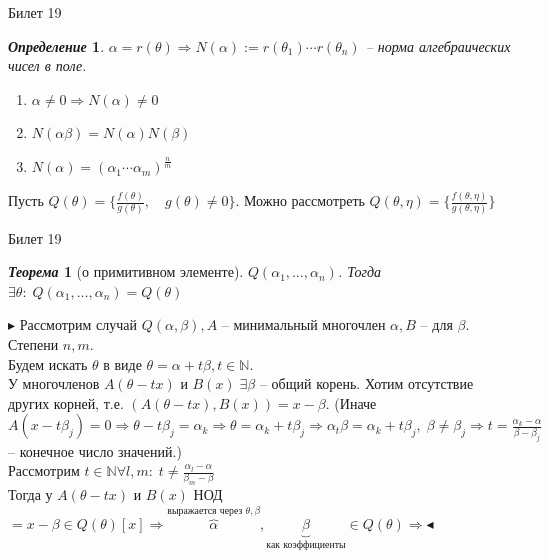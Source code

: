 \documentclass[a4paper,12pt]{article}
\newtheorem{deff}{\textit{Определение}}
\newtheorem{teo}{\textit{Теорема}}
\newcommand{\TE}{\theta}
\newcommand{\AL}{\alpha}
\newcommand{\q}{\quad}
\newcommand{\pb}{\blacktriangleright}
\newcommand{\pe}{\blacktriangleleft}
\newcommand{\Ra}{\Rightarrow}
\newcommand{\bb}[1]{\mathbb{#1}}
\begin{document}
\begin{mybox}{\hypertarget{bil19}{Билет 19}}
\begin{formbox}{}
\begin{deff} $\AL = r(\TE)\Ra N(\AL) := r(\TE_1)\cdots r(\TE_n)$ -- норма алгебраических чисел в поле.
\end{deff}
\end{formbox}

\begin{enumerate}
\item $\AL \not= 0 \Ra N(\AL) \not=0$
\item $N(\AL\beta) = N(\AL)N(\beta)$
\item $N(\AL) = (\AL_1\cdots\AL_m)^{\frac{n}{m}}$
\end{enumerate}
Пусть $Q(\TE) = \{\frac{f(\TE)}{g(\TE)}, \q g(\TE)\not=0\}$. Можно рассмотреть $Q(\TE, \eta) = \{\frac{f(\TE,\eta)}{g(\TE,\eta)}\}$\\
\end{mybox}

\newpage
\begin{mybox}{{Билет 19}}
\begin{formbox}{}
\begin{teo} [о примитивном элементе] $Q(\AL_1,\dots, \AL_n)$. Тогда $\exists \TE:\;Q(\AL_1,\dots, \AL_n) = Q(\TE)$
\end{teo}
\end{formbox}
$\pb$ Рассмотрим случай $Q(\AL, \beta), A$ -- минимальный многочлен $\AL, B$ -- для $\beta$. Степени $n, m$.\\
Будем искать $\TE$ в виде $\TE = \AL+t\beta, t\in\bb{N}$.\\
У многочленов $A(\TE - tx)$ и $B(x)\; \exists \beta$ -- общий корень. Хотим отсутствие других корней, т.е. $(A(\TE - tx), B(x)) = x - \beta$. (Иначе $A(x - t\beta_j) = 0\Ra \TE - t\beta_j = \AL_k \Ra \TE = \AL_k + t\beta_j\Ra \AL_t\beta = \AL_k + t\beta_j, \; \beta \not= \beta_j\Ra t = \frac{\AL_k - \AL}{\beta - \beta_j}$ -- конечное число значений.)\\
Рассмотрим $t\in\bb{N}\forall l,m:\; t\not=\frac{\AL_l-\AL}{\beta_m - \beta}$\\
Тогда у $A(\TE - tx)$ и $B(x)$ НОД $ = x - \beta \in Q(\TE)[x]\Ra \overbrace{\AL}^{\text{выражается через $\TE, \beta$}}, \underbrace{\beta}_{\text{как коэффициенты}} \in Q(\TE) \Ra \pe $

\end{mybox}
\end{document}
